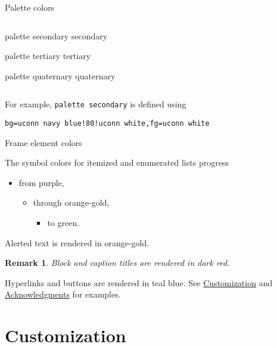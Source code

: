 \documentclass{beamer}
\newtheorem{remark}{Remark}
\begin{document}
\begin{frame}[fragile]{Palette colors}
\begin{columns}
\begin{column}{.5\textwidth}
\begin{beamercolorbox}[sep=4pt,center]{palette secondary}
secondary
\end{beamercolorbox}

\begin{beamercolorbox}[sep=4pt,center]{palette tertiary}
tertiary
\end{beamercolorbox}

\begin{beamercolorbox}[sep=4pt,center]{palette quaternary}
quaternary
\end{beamercolorbox}

\end{column}
\end{columns}

\vspace{2ex}
For example, \verb|palette secondary| is defined using
\begin{verbatim}
bg=uconn navy blue!80!uconn white,fg=uconn white
\end{verbatim}

\end{frame}


\begin{frame}{Frame element colors}

The symbol colors for itemized and enumerated lists progress
\begin{itemize}
\item from purple,
\begin{itemize}
\item through orange-gold,
\begin{itemize}
\item to green.
\end{itemize}
\end{itemize}
\end{itemize}
\alert{Alerted text is rendered in orange-gold.}

\vfill\begin{remark}
Block and caption titles are rendered in dark red.
\end{remark}

\vfill
Hyperlinks and buttons are rendered in teal blue.
See \hyperlink{sec:customization}{Customization} and \hyperlink{slide:acknowledgments}{Acknowledgments} for examples.

\end{frame}


\section{Customization}
\label{sec:customization}
\end{document}
